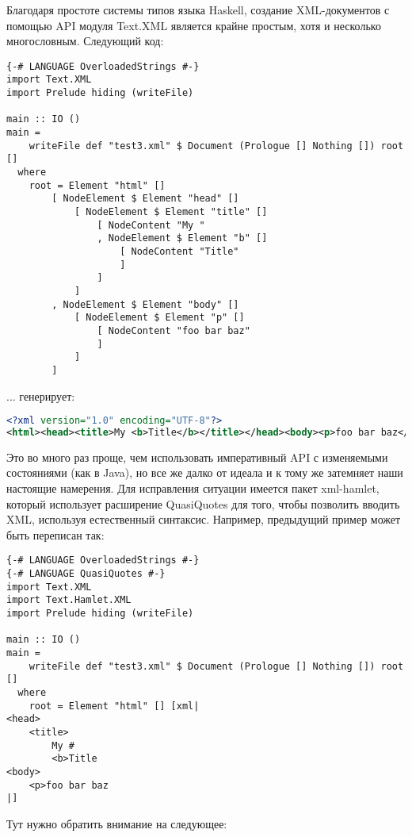 Благодаря простоте системы типов языка Haskell, создание XML-документов с помощью API модуля Text.XML является крайне простым, хотя и несколько многословным. Следующий код:

\begin{lstlisting}
{-# LANGUAGE OverloadedStrings #-}
import Text.XML
import Prelude hiding (writeFile)

main :: IO ()
main =
    writeFile def "test3.xml" $ Document (Prologue [] Nothing []) root []
  where
    root = Element "html" []
        [ NodeElement $ Element "head" []
            [ NodeElement $ Element "title" []
                [ NodeContent "My "
                , NodeElement $ Element "b" []
                    [ NodeContent "Title"
                    ]
                ]
            ]
        , NodeElement $ Element "body" []
            [ NodeElement $ Element "p" []
                [ NodeContent "foo bar baz"
                ]
            ]
        ]
\end{lstlisting}

... генерирует:

\begin{lstlisting}[language=XML]
<?xml version="1.0" encoding="UTF-8"?>
<html><head><title>My <b>Title</b></title></head><body><p>foo bar baz</p></body></html>
\end{lstlisting}

Это во много раз проще, чем использовать императивный API с изменяемыми состояниями (как в Java), но все же далко от идеала и к тому же затемняет наши настоящие намерения. Для исправления ситуации имеется пакет xml-hamlet, который использует расширение QuasiQuotes для того, чтобы позволить вводить XML, используя естественный синтаксис. Например, предыдущий пример может быть переписан так:

\begin{lstlisting}
{-# LANGUAGE OverloadedStrings #-}
{-# LANGUAGE QuasiQuotes #-}
import Text.XML
import Text.Hamlet.XML
import Prelude hiding (writeFile)

main :: IO ()
main =
    writeFile def "test3.xml" $ Document (Prologue [] Nothing []) root []
  where
    root = Element "html" [] [xml|
<head>
    <title>
        My #
        <b>Title
<body>
    <p>foo bar baz
|]
\end{lstlisting}%

Тут нужно обратить внимание на следующее:

